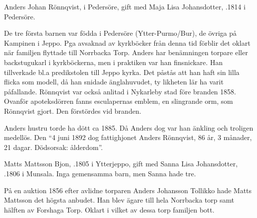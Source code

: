 Anders Johan Rönnqvist,  i Pedersöre, gift med Maja Lisa Johansdotter, .1814 i Pedersöre.
\begin{jhchildren}
  \item {}
  \item {}
  \item {}
  \item {}
  \item {}
  \item {}
  \item {}
  \item {}
\end{jhchildren}

De tre första barnen var födda i Pedersöre (Ytter-Purmo/Bur), de övriga på Kampinen i Jeppo. Pga avsaknad av kyrkböcker från denna tid förblir det oklart när familjen flyttade till Norrbacka Torp. Anders har benämningen torpare eller backstugukarl i kyrkböckerna, men i praktiken var han finsnickare. Han tillverkade bl.a predikstolen till Jeppo kyrka. Det påstås att han haft sin lilla flicka som modell, då han snidade änglahuvudet, ty likheten lär ha varit påfallande. Rönnqvist var också anlitad i Nykarleby stad före branden 1858. Ovanför apoteksdörren fanns esculapernas emblem, en slingrande orm, som Rönnqvist gjort. Den förstördes vid branden.

Anders hustru torde ha dött ca 1885. Då Anders dog var han änkling och troligen medellös. Den ``4 juni 1892 dog fattighjonet Anders Rönnqvist, 86 år, 3 månader, 21 dagar. Dödsorsak: ålderdom''.


Matts Mattsson Bjon, .1805 i Ytterjeppo, gift med Sanna Lisa Johansdotter, .1806 i Munsala. Inga gemensamma barn, men Sanna hade tre.
\begin{jhchildren}
  \item {}
  \item {}
  \item {}
\end{jhchildren}

På en auktion 1856 efter avlidne torparen Anders Johansson Tollikko hade Matts Mattsson det högsta anbudet. Han blev ägare till hela	Norrbacka torp samt hälften av Forshaga Torp. Oklart i vilket av dessa torp  familjen bott.



